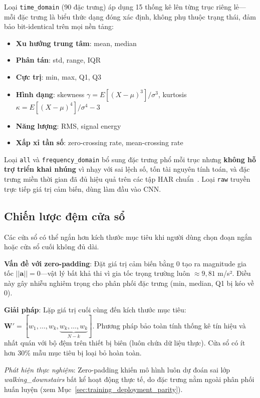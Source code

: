 Loại \texttt{time\_domain} (90 đặc trưng) áp dụng 15 thống kê lên từng trục riêng lẻ---mỗi đặc trưng là biểu thức dạng đóng xác định, không phụ thuộc trạng thái, đảm bảo bit-identical trên mọi nền tảng:
\begin{itemize}
    \item \textbf{Xu hướng trung tâm}: mean, median
    \item \textbf{Phân tán}: std, range, IQR
    \item \textbf{Cực trị}: min, max, Q1, Q3
    \item \textbf{Hình dạng}: skewness $\gamma = E[(X-\mu)^3]/\sigma^3$, kurtosis $\kappa = E[(X-\mu)^4]/\sigma^4 - 3$
    \item \textbf{Năng lượng}: RMS, signal energy
    \item \textbf{Xấp xỉ tần số}: zero-crossing rate, mean-crossing rate
\end{itemize}

Loại \texttt{all} và \texttt{frequency\_domain} bổ sung đặc trưng phổ mỗi trục nhưng \textbf{không hỗ trợ triển khai nhúng} vì nhạy với sai lệch số, tốn tài nguyên tính toán, và đặc trưng miền thời gian đã đủ hiệu quả trên các tập HAR chuẩn~\cite{banos2014wisdm}. Loại \texttt{raw} truyền trực tiếp giá trị cảm biến, dùng làm đầu vào CNN.

\subsection{Chiến lược đệm cửa sổ}
\label{sec:window_padding}

Các cửa sổ có thể ngắn hơn kích thước mục tiêu khi người dùng chọn đoạn ngắn hoặc cửa sổ cuối không đủ dài.

\textbf{Vấn đề với zero-padding}: Đặt giá trị cảm biến bằng 0 tạo ra magnitude gia tốc $||\mathbf{a}|| = 0$---vật lý bất khả thi vì gia tốc trọng trường luôn $\approx 9{,}81$ m/s². Điều này gây nhiễu nghiêm trọng cho phân phối đặc trưng (min, median, Q1 bị kéo về 0).

\textbf{Giải pháp}: Lặp giá trị cuối cùng đến kích thước mục tiêu: $\mathbf{W}' = [w_1, \ldots, w_k, \underbrace{w_k, \ldots, w_k}_{N-k}]$. Phương pháp bảo toàn tính thống kê tín hiệu và nhất quán với bộ đệm trên thiết bị biên (luôn chứa dữ liệu thực). Cửa sổ có ít hơn 30\% mẫu mục tiêu bị loại bỏ hoàn toàn.

\textit{Phát hiện thực nghiệm}: Zero-padding khiến mô hình luôn dự đoán sai lớp \textit{walking\_downstairs} bất kể hoạt động thực tế, do đặc trưng nằm ngoài phân phối huấn luyện (xem Mục~\ref{sec:training_deployment_parity}).

